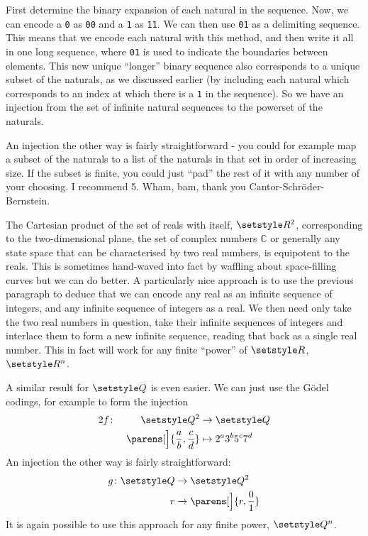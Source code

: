 First determine the binary expansion of each natural in the sequence. Now, we
can encode a \texttt 0 as \texttt{00} and a \texttt 1 as \texttt{11}. We can
then use \texttt{01} as a delimiting sequence. This means that we encode each
natural with this method, and then write it all in one long sequence, where
\texttt{01} is used to indicate the boundaries between elements. This new unique
``longer'' binary sequence also corresponds to a unique subset of the naturals,
as we discussed earlier (by including each natural which corresponds to an index
at which there is a \texttt 1 in the sequence). So we have an injection from the
set of infinite natural sequences to the powerset of the naturals.

An injection the other way is fairly straightforward - you could for example map
a subset of the naturals to a list of the naturals in that set in order of
increasing size. If the subset is finite, you could just ``pad'' the rest of it
with any number of your choosing. I recommend 5. Wham, bam, thank you
Cantor-Schr\"oder-Bernstein.

The Cartesian product of the set of reals with itself, \(\Reals^2\),
corresponding to the two-dimensional plane, the set of complex numbers
\(\mathbb C\) or generally any state space that can be characterised by two real
numbers, is equipotent to the reals. This is sometimes hand-waved into fact by
waffling about space-filling curves but we can do better. A particularly nice
approach is to use the previous paragraph to deduce that we can encode any real
as an infinite sequence of integers, and any infinite sequence of integers as a
real. We then need only take the two real numbers in question, take their
infinite sequences of integers and interlace them to form a new infinite
sequence, reading that back as a single real number. This in fact will work for
any finite ``power'' of \(\Reals\), \(\Reals^n\).

A similar result for \(\Rationals\) is even easier. We can just use the G\"odel
codings, for example to form the injection
\begin{alignat*}2
 f \colon &&\Rationals^2 &\to \Rationals \\
          &&\parens[\Big]{\frac ab, \frac cd} &\mapsto 2^a 3^b 5^c 7^d
\end{alignat*}
An injection the other way is fairly straightforward:
\begin{align*}
 g \colon \Rationals &\to \Rationals^2 \\
          r &\to \parens[\Big]{r, \frac 01}
\end{align*}
It is again possible to use this approach for any finite power,
\(\Rationals^n\).

